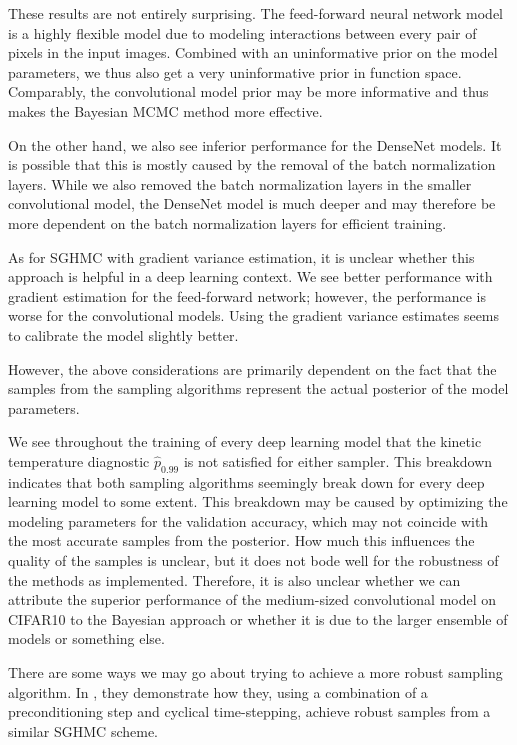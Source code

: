 These results are not entirely surprising.
The feed-forward neural network model is a highly flexible model due to modeling interactions between every pair of pixels in the input images. 
Combined with an uninformative prior on the model parameters, we thus also get a very uninformative prior in function space.
Comparably, the convolutional model prior may be more informative and thus makes the Bayesian MCMC method more effective. 

On the other hand, we also see inferior performance for the DenseNet models. 
It is possible that this is mostly caused by the removal of the batch normalization layers. 
While we also removed the batch normalization layers in the smaller convolutional model, the DenseNet model is much deeper and may therefore be more dependent on the batch normalization layers for efficient training.

As for SGHMC with gradient variance estimation, it is unclear whether this approach is helpful in a deep learning context. 
We see better performance with gradient estimation for the feed-forward network; however, the performance is worse for the convolutional models.
Using the gradient variance estimates seems to calibrate the model slightly better.

However, the above considerations are primarily dependent on the fact that the samples from the sampling algorithms represent the actual posterior of the model parameters. 

We see throughout the training of every deep learning model that the kinetic temperature diagnostic $\hat{p}_{0.99}$ is not satisfied for either sampler. 
This breakdown indicates that both sampling algorithms seemingly break down for every deep learning model to some extent. 
This breakdown may be caused by optimizing the modeling parameters for the validation accuracy, which may not coincide with the most accurate samples from the posterior. 
How much this influences the quality of the samples is unclear, but it does not bode well for the robustness of the methods as implemented.
Therefore, it is also unclear whether we can attribute the superior performance of the medium-sized convolutional model on CIFAR10 to the Bayesian approach or whether it is due to the larger ensemble of models or something else.

There are some ways we may go about trying to achieve a more robust sampling algorithm. 
In \autocite{wenzel_how_2020}, they demonstrate how they, using a combination of a preconditioning step and cyclical time-stepping, achieve robust samples from a similar SGHMC scheme.  

